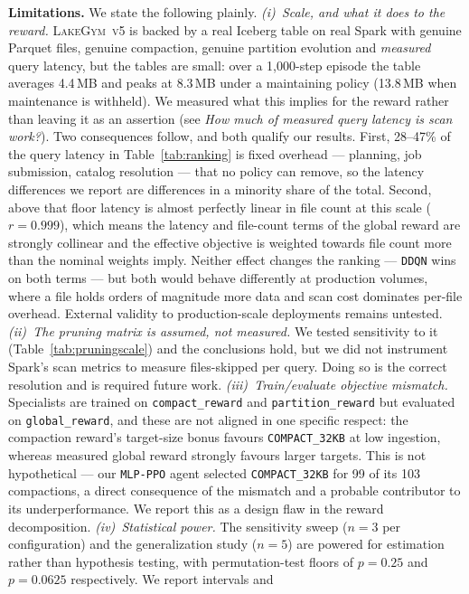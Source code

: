 \documentclass[fleqn,10pt]{wlscirep}
\newcommand{\env}{\textsc{LakeGym~v5}}
\newcommand{\mlpppo}{\texttt{MLP-PPO}}
\newcommand{\ddqn}{\texttt{DDQN}}
\newcommand{\cthirtytwo}{\texttt{COMPACT\_32KB}}
\begin{document}
\textbf{Limitations.}
We state the following plainly.
\emph{(i)~Scale, and what it does to the reward.} \env{} is backed by a
real Iceberg table on real Spark with genuine Parquet files, genuine
compaction, genuine partition evolution and \emph{measured} query
latency, but the tables are small: over a 1{,}000-step episode the table
averages 4.4\,MB and peaks at 8.3\,MB under a maintaining policy
(13.8\,MB when maintenance is withheld). We measured what this implies
for the reward rather than leaving it as an assertion (see \emph{How
much of measured query latency is scan work?}). Two consequences follow,
and both qualify our results. First, 28--47\% of the query latency in
Table~\ref{tab:ranking} is fixed overhead --- planning, job submission,
catalog resolution --- that no policy can remove, so the latency
differences we report are differences in a minority share of the total.
Second, above that floor latency is almost perfectly linear in file
count at this scale ($r = 0.999$), which means the latency and
file-count terms of the global reward are strongly collinear and the
effective objective is weighted towards file count more than the nominal
weights imply. Neither effect changes the ranking --- \ddqn{} wins on
both terms --- but both would behave differently at production volumes,
where a file holds orders of magnitude more data and scan cost dominates
per-file overhead. External validity to production-scale deployments
remains untested.
\emph{(ii)~The pruning matrix is assumed, not measured.} We tested
sensitivity to it (Table~\ref{tab:pruningscale}) and the conclusions
hold, but we did not instrument Spark's scan metrics to measure
files-skipped per query. Doing so is the correct resolution and is
required future work.
\emph{(iii)~Train/evaluate objective mismatch.} Specialists are trained
on \texttt{compact\_reward} and \texttt{partition\_reward} but evaluated
on \texttt{global\_reward}, and these are not aligned in one specific
respect: the compaction reward's target-size bonus favours
\cthirtytwo{} at low ingestion, whereas measured global reward strongly
favours larger targets. This is not hypothetical --- our \mlpppo{} agent
selected \cthirtytwo{} for 99 of its 103 compactions, a direct
consequence of the mismatch and a probable contributor to its
underperformance. We report this as a design flaw in the reward
decomposition.
\emph{(iv)~Statistical power.} The sensitivity sweep ($n=3$ per
configuration) and the generalization study ($n=5$) are powered for
estimation rather than hypothesis testing, with permutation-test floors
of $p = 0.25$ and $p = 0.0625$ respectively. We report intervals and
\end{document}
